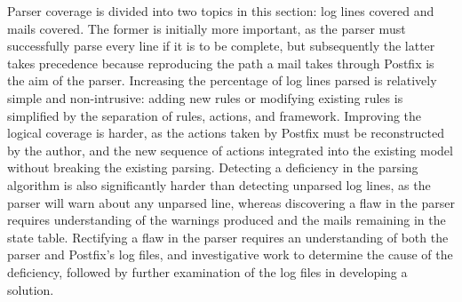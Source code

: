 Parser coverage is divided into two topics in this section: log lines
covered and mails covered.  The former is initially more important, as the
parser must successfully parse every line if it is to be complete, but
subsequently the latter takes precedence because reproducing the path a
mail takes through Postfix is the aim of the parser.  Increasing the
percentage of log lines parsed is relatively simple and non-intrusive:
adding new rules or modifying existing rules is simplified by the
separation of rules, actions, and framework.  Improving the logical
coverage is harder, as the actions taken by Postfix must be reconstructed
by the author, and the new sequence of actions integrated into the existing
model without breaking the existing parsing.  Detecting a deficiency in the
parsing algorithm is also significantly harder than detecting unparsed log
lines, as the parser will warn about any unparsed line, whereas discovering
a flaw in the parser requires understanding of the warnings produced and
the mails remaining in the state table.  Rectifying a flaw in the parser
requires an understanding of both the parser and Postfix's log files, and
investigative work to determine the cause of the deficiency, followed by
further examination of the log files in developing a solution.

